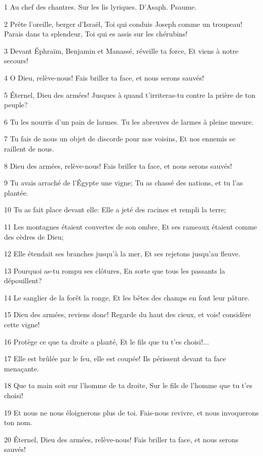 \par 1 Au chef des chantres. Sur les lis lyriques. D'Asaph. Psaume.
\par 2 Prête l'oreille, berger d'Israël, Toi qui conduis Joseph comme un troupeau! Parais dans ta splendeur, Toi qui es assis sur les chérubins!
\par 3 Devant Éphraïm, Benjamin et Manassé, réveille ta force, Et viens à notre secours!
\par 4 O Dieu, relève-nous! Fais briller ta face, et nous serons sauvés!
\par 5 Éternel, Dieu des armées! Jusques à quand t'irriteras-tu contre la prière de ton peuple?
\par 6 Tu les nourris d'un pain de larmes. Tu les abreuves de larmes à pleine mesure.
\par 7 Tu fais de nous un objet de discorde pour nos voisins, Et nos ennemis se raillent de nous.
\par 8 Dieu des armées, relève-nous! Fais briller ta face, et nous serons sauvés!
\par 9 Tu avais arraché de l'Égypte une vigne; Tu as chassé des nations, et tu l'as plantée.
\par 10 Tu as fait place devant elle: Elle a jeté des racines et rempli la terre;
\par 11 Les montagnes étaient couvertes de son ombre, Et ses rameaux étaient comme des cèdres de Dieu;
\par 12 Elle étendait ses branches jusqu'à la mer, Et ses rejetons jusqu'au fleuve.
\par 13 Pourquoi as-tu rompu ses clôtures, En sorte que tous les passants la dépouillent?
\par 14 Le sanglier de la forêt la ronge, Et les bêtes des champs en font leur pâture.
\par 15 Dieu des armées, reviens donc! Regarde du haut des cieux, et vois! considère cette vigne!
\par 16 Protège ce que ta droite a planté, Et le fils que tu t'es choisi!...
\par 17 Elle est brûlée par le feu, elle est coupée! Ils périssent devant ta face menaçante.
\par 18 Que ta main soit sur l'homme de ta droite, Sur le fils de l'homme que tu t'es choisi!
\par 19 Et nous ne nous éloignerons plus de toi. Fais-nous revivre, et nous invoquerons ton nom.
\par 20 Éternel, Dieu des armées, relève-nous! Fais briller ta face, et nous serons sauvés!

